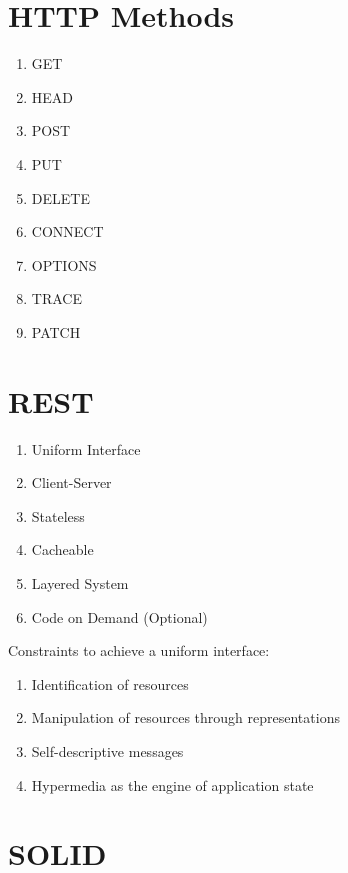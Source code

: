 \documentclass [8pt] {extarticle}
\begin{document}
    \section {HTTP Methods}

    \begin {enumerate}
        \item GET
        \item HEAD
        \item POST
        \item PUT
        \item DELETE
        \item CONNECT
        \item OPTIONS
        \item TRACE
        \item PATCH
    \end {enumerate}

    \section {REST}

    \begin {enumerate}
        \item Uniform Interface
        \item Client-Server
        \item Stateless
        \item Cacheable
        \item Layered System
        \item Code on Demand (Optional)
    \end {enumerate}

    \smallskip

    Constraints to achieve a uniform interface:

    \begin {enumerate}
        \item Identification of resources
        \item Manipulation of resources through representations
        \item Self-descriptive messages
        \item Hypermedia as the engine of application state
    \end {enumerate}

    \section {SOLID}
\end{document}
